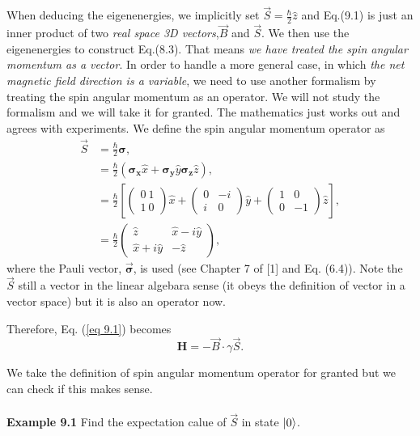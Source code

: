 \documentclass{article}
\begin{document}
When deducing the eigenenergies, we implicitly set $\vec{S}=\frac{\hbar}{2}\hat{z}$ and Eq.(9.1) is
just an inner product of two \textit{real space 3D vectors},$\vec{B}$ and $\vec{S}$.
We then use the eigenenergies to construct Eq.(8.3). That means \textit{we have treated the spin angular
momentum as a vector}. In order to handle a more general case, in which \textit{the net magnetic
field direction is a variable}, we need to use another formalism by treating
the spin angular momentum as an operator. We will not study the formalism and we will 
take it for granted. The mathematics just works out and agrees with experiments.
We define the spin angular momentum operator as 
\begin{align*}\label{eq 9.2}
    \vec{S}&=\frac{\hbar}{2}\boldsymbol{\sigma},\\
    &=\frac{\hbar}{2}(\boldsymbol{\sigma_x}\hat{x}+\boldsymbol{\sigma_y}\hat{y}\boldsymbol{\sigma_z}\hat{z}),\\
    &=\frac{\hbar}{2}\left[\begin{pmatrix}
        0\ 1\\ 1\ 0
    \end{pmatrix}\hat{x}+
    \begin{pmatrix}
        0&-i\\i&0
    \end{pmatrix}\hat{y}+
    \begin{pmatrix}
        1&0\\0&-1
    \end{pmatrix}\hat{z}\right],\\
    &=\frac{\hbar}{2}\begin{pmatrix}
        \hat{z}&\hat{x}-i\hat{y}\\
        \hat{x}+i\hat{y}&-\hat{z}
    \end{pmatrix},\tag{9.2}
\end{align*}
where the Pauli vector, $\vec{\boldsymbol{\sigma}}$, is used (see Chapter 7 of [1] and Eq. (6.4)).
Note the $\vec{S}$ still a vector in the linear algebara sense (it obeys the definition of vector in a vector space)
but it is also an operator now.

Therefore, Eq. (\ref{eq 9.1}) becomes
\begin{equation}\label{eq 9.3}
    \boldsymbol{H}=-\vec{B}\cdot\gamma\vec{S}.\tag{9.3}
\end{equation}

We take the definition of spin angular momentum operator for granted but we can 
check if this makes sense.\\\\
\textbf{Example 9.1} Find the expectation calue of $\vec{S}$ in state $\ket{0}$.
\end{document}
